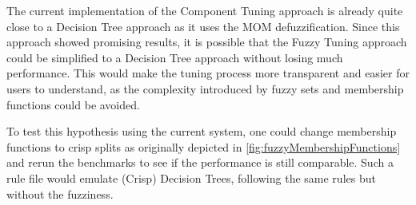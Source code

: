 The current implementation of the Component Tuning approach is already quite close to a Decision Tree approach as it uses the MOM defuzzification. Since this approach showed promising results, it is possible that the Fuzzy Tuning approach could be simplified to a Decision Tree approach without losing much performance. This would make the tuning process more transparent and easier for users to understand, as the complexity introduced by fuzzy sets and membership functions could be avoided.

To test this hypothesis using the current system, one could change membership functions to crisp splits as originally depicted in \autoref{fig:fuzzyMembershipFunctions} and rerun the benchmarks to see if the performance is still comparable. Such a rule file would emulate (Crisp) Decision Trees, following the same rules but without the fuzziness.